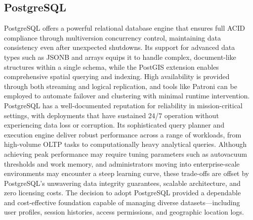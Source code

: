 \subsection{PostgreSQL}
PostgreSQL offers a powerful relational database engine that ensures full ACID compliance through multiversion concurrency control, maintaining data consistency even after unexpected shutdowns. Its support for advanced data types such as JSONB and arrays equips it to handle complex, document-like structures within a single schema, while the PostGIS extension enables comprehensive spatial querying and indexing. High availability is provided through both streaming and logical replication, and tools like Patroni can be employed to automate failover and clustering with minimal runtime intervention. PostgreSQL has a well-documented reputation for reliability in mission-critical settings, with deployments that have sustained 24/7 operation without experiencing data loss or corruption. Its sophisticated query planner and execution engine deliver robust performance across a range of workloads, from high-volume OLTP tasks to computationally heavy analytical queries. Although achieving peak performance may require tuning parameters such as autovacuum thresholds and work memory, and administrators moving into enterprise-scale environments may encounter a steep learning curve, these trade-offs are offset by PostgreSQL’s unwavering data integrity guarantees, scalable architecture, and zero licensing costs. The decision to adopt PostgreSQL provided a dependable and cost-effective foundation capable of managing diverse datasets—including user profiles, session histories, access permissions, and geographic location logs.

